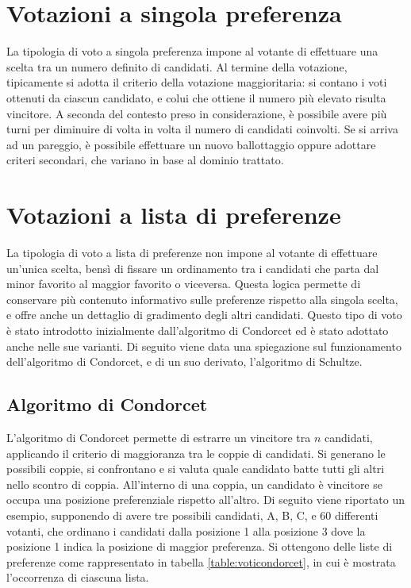 \documentclass[12pt,a4paper,openright,twoside]{book}
\begin{document}
\section{Votazioni a singola preferenza}
La tipologia di voto a singola preferenza impone al votante di effettuare una scelta tra un
numero definito di candidati. Al termine della votazione, tipicamente si adotta il criterio
della votazione maggioritaria: si contano i voti ottenuti da ciascun candidato, e colui che ottiene il
numero più elevato risulta vincitore. A seconda del contesto preso in considerazione,
è possibile avere più turni per diminuire di volta in volta il numero di candidati coinvolti.
Se si arriva ad un pareggio, è possibile effettuare un nuovo ballottaggio oppure adottare
criteri secondari, che variano in base al dominio trattato.
\section{Votazioni a lista di preferenze}
\label{chapter:votazionilistapreferenze}
La tipologia di voto a lista di preferenze non impone al votante di effettuare un'unica scelta,
bensì di fissare un ordinamento tra i candidati che parta dal minor favorito al maggior favorito 
o viceversa. Questa logica permette di conservare più contenuto informativo sulle preferenze
rispetto alla singola scelta, e offre anche un dettaglio di gradimento degli altri candidati.
Questo tipo di voto è stato introdotto inizialmente dall'algoritmo di Condorcet ed è stato adottato
anche nelle sue varianti. Di seguito viene data una spiegazione sul funzionamento dell'algoritmo
di Condorcet, e di un suo derivato, l'algoritmo di Schultze.
\subsection{Algoritmo di Condorcet}
L'algoritmo di Condorcet permette di estrarre un vincitore tra ${n}$ candidati,
applicando il criterio di maggioranza tra le coppie di candidati.
Si generano le possibili coppie, si confrontano e si valuta quale candidato batte tutti gli altri nello scontro di coppia. 
All'interno di una coppia, un candidato è vincitore se occupa una posizione preferenziale rispetto all'altro.
Di seguito viene riportato un esempio, supponendo di avere tre possibili candidati, A, B, C,
e 60 differenti votanti, che ordinano i candidati dalla posizione 1 alla posizione 3 dove la posizione 1 
indica la posizione di maggior preferenza.
Si ottengono delle liste di preferenze come rappresentato in tabella \ref{table:voticondorcet}, in cui
è mostrata l'occorrenza di ciascuna lista.
\end{document}
